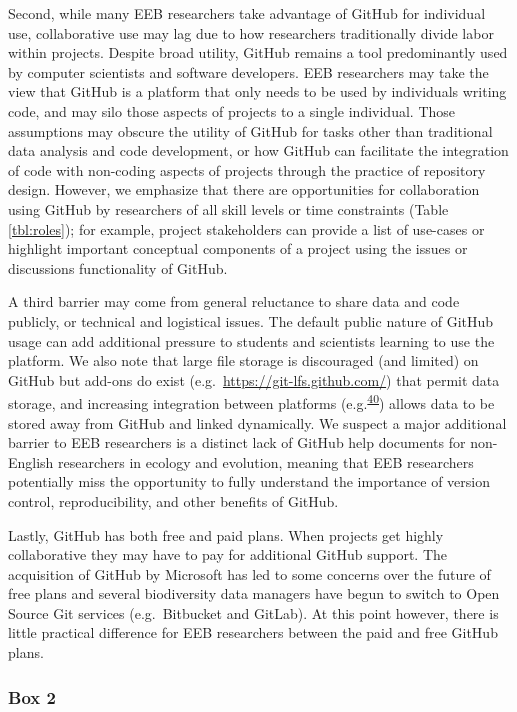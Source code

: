 Second, while many EEB researchers take advantage of GitHub for individual use, collaborative use may lag due to how researchers traditionally divide labor within projects.
Despite broad utility, GitHub remains a tool predominantly used by computer scientists and software developers.
EEB researchers may take the view that GitHub is a platform that only needs to be used by individuals writing code, and may silo those aspects of projects to a single individual.
Those assumptions may obscure the utility of GitHub for tasks other than traditional data analysis and code development, or how GitHub can facilitate the integration of code with non-coding aspects of projects through the practice of repository design.
However, we emphasize that there are opportunities for collaboration using GitHub by researchers of all skill levels or time constraints (Table \ref{tbl:roles}); for example, project stakeholders can provide a list of use-cases or highlight important conceptual components of a project using the issues or discussions functionality of GitHub.

A third barrier may come from general reluctance to share data and code publicly, or technical and logistical issues.
The default public nature of GitHub usage can add additional pressure to students and scientists learning to use the platform.
We also note that large file storage is discouraged (and limited) on GitHub but add-ons do exist (e.g.~\url{https://git-lfs.github.com/}) that permit data storage, and increasing integration between platforms (e.g.\textsuperscript{\protect\hyperlink{ref-lx49NGto}{40}}) allows data to be stored away from GitHub and linked dynamically.
We suspect a major additional barrier to EEB researchers is a distinct lack of GitHub help documents for non-English researchers in ecology and evolution, meaning that EEB researchers potentially miss the opportunity to fully understand the importance of version control, reproducibility, and other benefits of GitHub.

Lastly, GitHub has both free and paid plans.
When projects get highly collaborative they may have to pay for additional GitHub support.
The acquisition of GitHub by Microsoft has led to some concerns over the future of free plans and several biodiversity data managers have begun to switch to Open Source Git services (e.g.~Bitbucket and GitLab).
At this point however, there is little practical difference for EEB researchers between the paid and free GitHub plans.

\hypertarget{tips}{%
\subsubsection{Box 2}\label{tips}}

